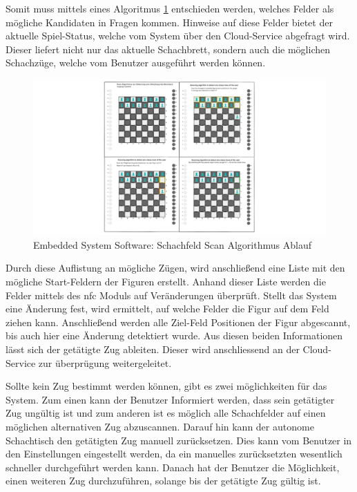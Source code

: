 Somit muss mittels eines Algoritmus \ref{ATC_ChessMoveAlgorithm}
entschieden werden, welches Felder als mögliche Kandidaten in Fragen
kommen. Hinweise auf diese Felder bietet der aktuelle Spiel-Status,
welche vom System über den Cloud-Service abgefragt wird. Dieser liefert
nicht nur das aktuelle Schachbrett, sondern auch die möglichen
Schachzüge, welche vom Benutzer ausgeführt werden können.

\begin{figure}
\centering
\includegraphics{images/ATC_ChessMoveAlgorithm.png}
\caption{Embedded System Software: Schachfeld Scan Algorithmus Ablauf
\label{ATC_ChessMoveAlgorithm}}
\end{figure}

Durch diese Auflistung an mögliche Zügen, wird anschließend eine Liste
mit den mögliche Start-Feldern der Figuren erstellt. Anhand dieser Liste
werden die Felder mittels des \gls{nfc} Moduls auf Veränderungen
überprüft. Stellt das System eine Änderung fest, wird ermittelt, auf
welche Felder die Figur auf dem Feld ziehen kann. Anschließend werden
alle Ziel-Feld Positionen der Figur abgescannt, bis auch hier eine
Änderung detektiert wurde. Aus diesen beiden Informationen lässt sich
der getätigte Zug ableiten. Dieser wird anschliessend an der
Cloud-Service zur überprügung weitergeleitet.

Sollte kein Zug bestimmt werden können, gibt es zwei möglichkeiten für
das System. Zum einen kann der Benutzer Informiert werden, dass sein
getätigter Zug ungültig ist und zum anderen ist es möglich alle
Schachfelder auf einen möglichen alternativen Zug abzuscannen. Darauf
hin kann der autonome Schachtisch den getätigten Zug manuell
zurücksetzen. Dies kann vom Benutzer in den Einstellungen eingestellt
werden, da ein manuelles zurücksetzten wesentlich schneller durchgeführt
werden kann. Danach hat der Benutzer die Möglichkeit, einen weiteren Zug
durchzuführen, solange bis der getätigte Zug gültig ist.

